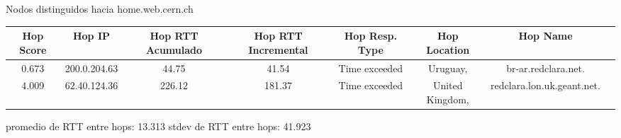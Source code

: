 Nodos distinguidos hacia home.web.cern.ch
\begin{center}
	\begin{tabular}{ c | c | c | c | c | c | c | c }
		\hline
		Hop Score & Hop IP & Hop RTT Acumulado & Hop RTT Incremental & Hop Resp. Type & Hop Location & Hop Name\\
		\hline
		0.673 & 200.0.204.63 & 44.75 & 41.54 & Time exceeded & Uruguay,  & br-ar.redclara.net.\\
		\hline
		4.009 & 62.40.124.36 & 226.12 & 181.37 & Time exceeded & United Kingdom,  & redclara.lon.uk.geant.net.\\
	\end{tabular}
\end{center}
promedio de RTT entre hops: 13.313
stdev de RTT entre hops: 41.923
